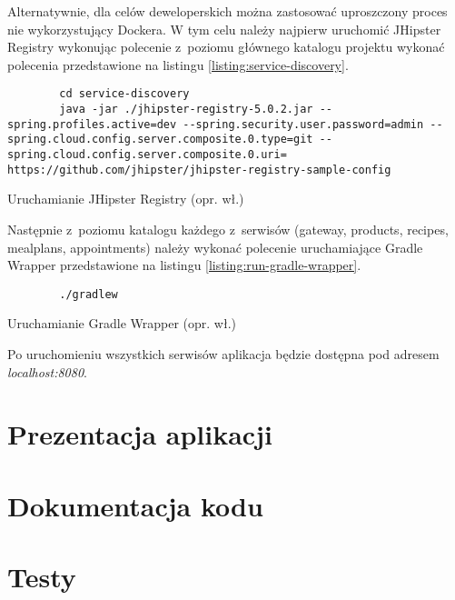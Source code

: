 Alternatywnie, dla celów deweloperskich można zastosować uproszczony proces nie wykorzystujący Dockera.
W tym celu należy najpierw uruchomić JHipster Registry wykonując polecenie z~poziomu głównego katalogu projektu
wykonać polecenia przedstawione na listingu \ref{listing:service-discovery}.
\begin{listing}[h!]
    \begin{verbatim}
        cd service-discovery
        java -jar ./jhipster-registry-5.0.2.jar --spring.profiles.active=dev --spring.security.user.password=admin --spring.cloud.config.server.composite.0.type=git --spring.cloud.config.server.composite.0.uri= https://github.com/jhipster/jhipster-registry-sample-config
    \end{verbatim}
    \centering\caption{Uruchamianie JHipster Registry (opr. wł.)}\label{listing:service-discovery}
\end{listing}

Następnie z~poziomu katalogu każdego z~serwisów (gateway, products, recipes, mealplans, appointments)
należy wykonać polecenie uruchamiające Gradle Wrapper przedstawione na listingu \ref{listing:run-gradle-wrapper}.
\begin{listing}[h!]
    \begin{verbatim}
        ./gradlew
    \end{verbatim}
    \centering\caption{Uruchamianie Gradle Wrapper (opr. wł.)}\label{listing:run-gradle-wrapper}
\end{listing}

Po uruchomieniu wszystkich serwisów aplikacja będzie dostępna pod adresem \textit{localhost:8080}.

\section{Prezentacja aplikacji}\label{sec:app-presentation}

\section{Dokumentacja kodu}\label{sec:code-documentation}
\section{Testy}\label{sec:tests}
\thispagestyle{normal}
